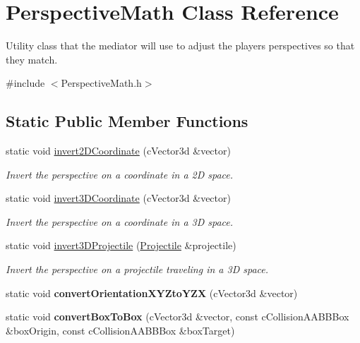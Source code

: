 \hypertarget{classPerspectiveMath}{
\section{PerspectiveMath Class Reference}
\label{classPerspectiveMath}
}


Utility class that the mediator will use to adjust the players perspectives so that they match.  




{\ttfamily \#include $<$PerspectiveMath.h$>$}

\subsection*{Static Public Member Functions}
\begin{DoxyCompactItemize}
\item 
static void \hyperlink{classPerspectiveMath_a65c41921db4ee62a8f3a92fb887cc8ce}{invert2DCoordinate} (cVector3d \&vector)
\begin{DoxyCompactList}\small\item\em Invert the perspective on a coordinate in a 2D space. \item\end{DoxyCompactList}\item 
static void \hyperlink{classPerspectiveMath_a37100d823fa9ed299d9987fd38c9e1f5}{invert3DCoordinate} (cVector3d \&vector)
\begin{DoxyCompactList}\small\item\em Invert the perspective on a coordinate in a 3D space. \item\end{DoxyCompactList}\item 
static void \hyperlink{classPerspectiveMath_a13cbb76a51ce78db12d4013b96586bd1}{invert3DProjectile} (\hyperlink{classProjectile}{Projectile} \&projectile)
\begin{DoxyCompactList}\small\item\em Invert the perspective on a projectile traveling in a 3D space. \item\end{DoxyCompactList}\item 
\hypertarget{classPerspectiveMath_a3a535221683e28fc95c5edae6c15d360}{
static void {\bfseries convertOrientationXYZtoYZX} (cVector3d \&vector)}
\label{classPerspectiveMath_a3a535221683e28fc95c5edae6c15d360}

\item 
\hypertarget{classPerspectiveMath_aa8fa5bbda93edd97ee3f0c280914fa6b}{
static void {\bfseries convertBoxToBox} (cVector3d \&vector, const cCollisionAABBBox \&boxOrigin, const cCollisionAABBBox \&boxTarget)}
\label{classPerspectiveMath_aa8fa5bbda93edd97ee3f0c280914fa6b}

\end{DoxyCompactItemize}



